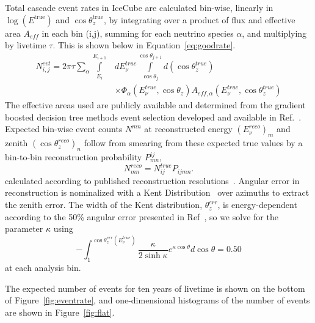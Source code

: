 \documentclass[main.tex]{subfiles}
\begin{document}
Total cascade event rates in IceCube are calculated bin-wise, linearly in $\log(E^{\text{true}})$ and $\cos\theta_{z}^{\text{true}}$, by integrating over a product of flux and effective area $A_{eff}$ in each bin (i,j), summing for each neutrino species \(\alpha\), and multiplying by livetime $\tau$. This is shown below in Equation~\ref{eq:goodrate}. 
\begin{equation}\label{eq:goodrate}\begin{split}
N^{evt}_{i,j} = 2\pi\tau\sum_{\alpha}\int\limits_{E_{i}}^{E_{i+1}} & dE^{true}_{\nu}\int\limits_{\cos\theta_{j}}^{\cos\theta_{j+1}} d(\cos\theta_{z}^{true})\\
& \times\Phi_{\alpha}(E_{\nu}^{true},\cos\theta_{z}) A_{eff, \alpha}(E_{\nu}^{true}, \cos\theta_{z}^{true})
\end{split}\end{equation}
The effective areas used are publicly available and determined from the gradient boosted decision tree methods event selection developed and available 
in Ref.~\cite{2018PhDT17N}.
Expected bin-wise event counts $N^{mn}$ at reconstructed energy $(E_{\nu}^{reco})_{m}$ and zenith $(\cos\theta_{z}^{reco})_{n}$ follow from smearing from these expected true values by a bin-to-bin reconstruction probability $P_{mn}^{ij}$,
\begin{equation}
N_{mn}^{reco}= N_{ij}^{true} P_{ijmn}.
\end{equation}
calculated according to published reconstruction resolutions~\cite{icecube_energy_reco, Aartsen_2017_monood}.
Angular error in reconstruction is nominalized with a Kent Distribution~\cite{10.2307/2984712} over azimuths to extract the zenith error.
The width of the Kent distribution, $\theta_{z}^{err}$, is energy-dependent according to the 50\% angular error presented in Ref~\cite{Aartsen_2017_monood}, so we solve for the parameter \(\kappa\) using
\begin{equation}
    -\int_{1}^{\cos\theta_{z}^{err}(E_{\nu}^{true})} \frac{\kappa}{2\sinh\kappa} e^{\kappa \cos\theta} d\cos\theta = 0.50
\end{equation}
at each analysis bin.

The expected number of events for ten years of livetime is shown on the bottom of Figure~\ref{fig:eventrate}, and one-dimensional histograms of the number of events are shown in Figure~\ref{fig:flat}. 
\end{document}
